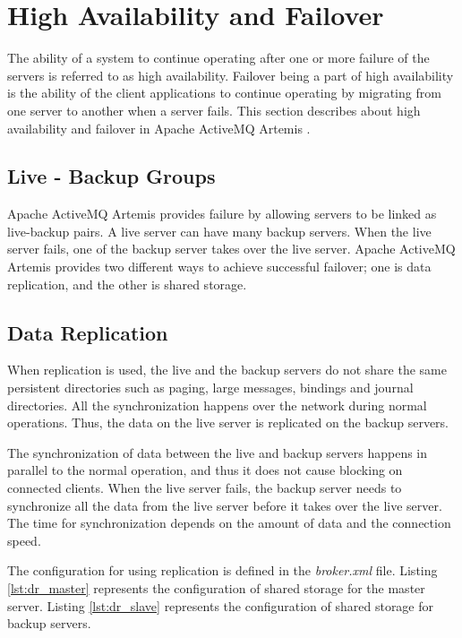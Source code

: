 \section{High Availability and Failover}

The ability of a system to continue operating after one or more failure of the servers is referred to as high availability. Failover being a part of high availability is the ability of the client applications to continue operating by migrating from one server to another when a server fails. This section describes about high availability and failover in Apache ActiveMQ Artemis \parencite{artemis_failover}.

\subsection{Live - Backup Groups}
Apache ActiveMQ Artemis provides failure by allowing servers to be linked as live-backup pairs. A live server can have many backup servers. When the live server fails, one of the backup server takes over the live server. Apache ActiveMQ Artemis provides two different ways to achieve successful failover; one is data replication, and the other is shared storage.

\subsection{Data Replication}

When replication is used, the live and the backup servers do not share the same persistent directories such as paging, large messages, bindings and journal directories. All the synchronization happens over the network during normal operations. Thus, the data on the live server is replicated on the backup servers. 

The synchronization of data between the live and backup servers happens in parallel to the normal operation, and thus it does not cause blocking on connected clients. When the live server fails, the backup server needs to synchronize all the data from the live server before it takes over the live server. The time for synchronization depends on the amount of data and the connection speed. 

The configuration for using replication is defined in the \textit{broker.xml} file. Listing \ref{lst:dr_master} represents the configuration of shared storage for the master server. Listing \ref{lst:dr_slave} represents the configuration of shared storage for backup servers.

